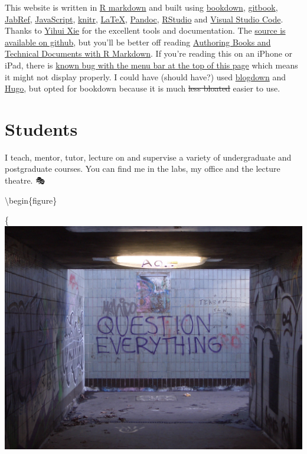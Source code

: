 \documentclass[12pt,]{book}
\begin{document}
This website is written in \href{https://rmarkdown.rstudio.com/}{R markdown} and built using \href{https://bookdown.org}{bookdown}, \href{https://www.gitbook.com}{gitbook}, \href{http://www.jabref.org/}{JabRef}, \href{https://en.wikipedia.org/wiki/JavaScript}{JavaScript}, \href{https://en.wikipedia.org/wiki/Knitr}{knitr}, \href{https://en.wikipedia.org/wiki/LaTeX}{LaTeX}, \href{https://pandoc.org/}{Pandoc}, \href{https://www.rstudio.com/}{RStudio} and \href{https://code.visualstudio.com/}{Visual Studio Code}. Thanks to \href{https://yihui.name/}{Yihui Xie} for the excellent tools and documentation. The \href{https://github.com/dullhunk/hulled}{source is available on github}, but you'll be better off reading \href{https://bookdown.org/yihui/bookdown/}{Authoring Books and Technical Documents with R Markdown}. If you're reading this on an iPhone or iPad, there is \href{https://github.com/rstudio/bookdown/issues/60}{known bug with the menu bar at the top of this page} which means it might not display properly. I could have (should have?) used \href{https://bookdown.org/yihui/blogdown/}{blogdown} and \href{https://gohugo.io}{Hugo}, but opted for bookdown because it is much \sout{less bloated} easier to use. 🔨

\hypertarget{teaching}{%
\chapter{Students}\label{teaching}}

I teach, mentor, tutor, lecture on and supervise a variety of undergraduate and postgraduate courses. You can find me in the labs, my office and the lecture theatre. 🎭

\textbackslash{}begin\{figure\}

\{\centering \includegraphics[width=0.75\linewidth]{images/question-everything}
\end{document}
